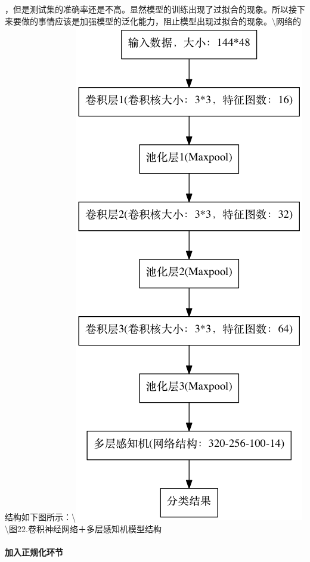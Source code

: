 ，但是测试集的准确率还是不高。显然模型的训练出现了过拟合的现象。所以接下来要做的事情应该是加强模型的泛化能力，阻止模型出现过拟合的现象。\textbackslash{}网络的结构如下图所示：\textbackslash{}\includegraphics{picture/cnn-mlp.png}\textbackslash{}图22.卷积神经网络＋多层感知机模型结构

\paragraph{加入正规化环节}\label{ux52a0ux5165ux6b63ux89c4ux5316ux73afux8282}

